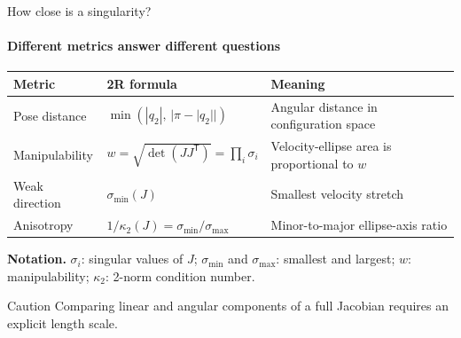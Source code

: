 \documentclass[aspectratio=169]{beamer}
\begin{document}
\begin{frame}[t]{How close is a singularity?}
    \framesubtitle{Different metrics answer different questions}
    \small
    \begin{tabularx}{\textwidth}{>{\raggedright\arraybackslash}p{} >{\raggedright\arraybackslash}p{} X}
        \toprule
        Metric & 2R formula & Meaning \\
        \midrule
        Pose distance & $\min(|q_2|,\,|\pi-|q_2||)$ & Angular distance in configuration space \\
        Manipulability & $w=\sqrt{\det(JJ^{\mathsf T})}=\prod_i\sigma_i$ & Velocity-ellipse area is proportional to $w$ \\
        Weak direction & $\sigma_{\min}(J)$ & Smallest velocity stretch \\
        Anisotropy & $1/\kappa_2(J)=\sigma_{\min}/\sigma_{\max}$ & Minor-to-major ellipse-axis ratio \\
        \bottomrule
    \end{tabularx}
    \scriptsize\textbf{Notation.} $\sigma_i$: singular values of $J$; $\sigma_{\min}$ and $\sigma_{\max}$: smallest and largest; $w$: manipulability; $\kappa_2$: 2-norm condition number.
    \begin{block}{Caution}
        Comparing linear and angular components of a full Jacobian requires an explicit length scale.
    \end{block}
\end{frame}
\end{document}
